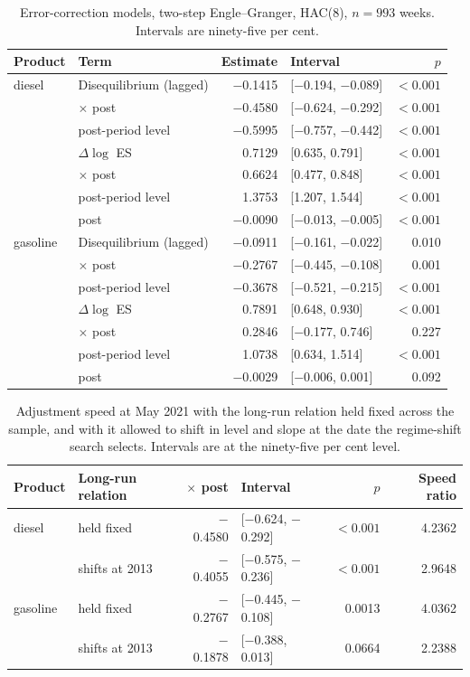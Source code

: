 \documentclass[11pt,a4paper]{article}
\begin{document}
\begin{table}[htbp]
\centering
\caption{Error-correction models, two-step Engle--Granger, HAC(8), $n=993$ weeks. Intervals
are ninety-five per cent.}
\label{tab:ecm}
\begin{tabular}{llrlr}
\toprule
Product & Term & Estimate & Interval & $p$ \\
\midrule
diesel & Disequilibrium (lagged) & $-$0.1415 & [$-$0.194, $-$0.089] & $<0.001$ \\
 & \quad $\times$ post & $-$0.4580 & [$-$0.624, $-$0.292] & $<0.001$ \\
 & \quad post-period level & $-$0.5995 & [$-$0.757, $-$0.442] & $<0.001$ \\
 & $\Delta \log$ ES & 0.7129 & [0.635, 0.791] & $<0.001$ \\
 & \quad $\times$ post & 0.6624 & [0.477, 0.848] & $<0.001$ \\
 & \quad post-period level & 1.3753 & [1.207, 1.544] & $<0.001$ \\
 & post & $-$0.0090 & [$-$0.013, $-$0.005] & $<0.001$ \\
\midrule
gasoline & Disequilibrium (lagged) & $-$0.0911 & [$-$0.161, $-$0.022] & 0.010 \\
 & \quad $\times$ post & $-$0.2767 & [$-$0.445, $-$0.108] & 0.001 \\
 & \quad post-period level & $-$0.3678 & [$-$0.521, $-$0.215] & $<0.001$ \\
 & $\Delta \log$ ES & 0.7891 & [0.648, 0.930] & $<0.001$ \\
 & \quad $\times$ post & 0.2846 & [$-$0.177, 0.746] & 0.227 \\
 & \quad post-period level & 1.0738 & [0.634, 1.514] & $<0.001$ \\
 & post & $-$0.0029 & [$-$0.006, 0.001] & 0.092 \\
\bottomrule
\end{tabular}
\end{table}
\begin{table}[htbp]
\centering
\caption{Adjustment speed at May 2021 with the long-run relation held fixed across the sample,
and with it allowed to shift in level and slope at the date the regime-shift search selects.
Intervals are at the ninety-five per cent level.\label{tab:ecmbreak}}
\begin{tabular}{llrlrr}
\toprule
Product & Long-run relation & $\times$ post & Interval & $p$ & Speed ratio \\
\midrule
diesel & held fixed & $-$0.4580 & [$-$0.624, $-$0.292] & $<0.001$ & 4.2362 \\
 & shifts at 2013 & $-$0.4055 & [$-$0.575, $-$0.236] & $<0.001$ & 2.9648 \\
\midrule
gasoline & held fixed & $-$0.2767 & [$-$0.445, $-$0.108] & 0.0013 & 4.0362 \\
 & shifts at 2013 & $-$0.1878 & [$-$0.388, 0.013] & 0.0664 & 2.2388 \\
\bottomrule
\end{tabular}
\end{table}
\end{document}
